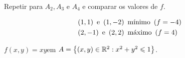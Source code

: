 \documentclass{book}
\begin{document}
\begin{sol}
Repetir para $A_2, A_3$ e $A_4$ e comparar os valores de $f$.

\[
\begin{gathered}
      \left( {1,1} \right){\text{ e }}\left( {1, - 2} \right){\text{ m\'inimo }}\left( {f =  - 4} \right) \hfill \\
      \left( {2, - 1} \right){\text{ e }}\left( {2,2} \right){\text{ m\'aximo }}\left( {f = 4} \right) \hfill \\
\end{gathered}
\]

\end{sol}

\begin{ex}
    $f\left( {x,y} \right) = xy$em $A = \left\{ {\left( {x,y} \right) \in \mathbb{R}^2 :x^2  + y^2  \leqslant 1} \right\}$.
\end{ex}
\end{document}
